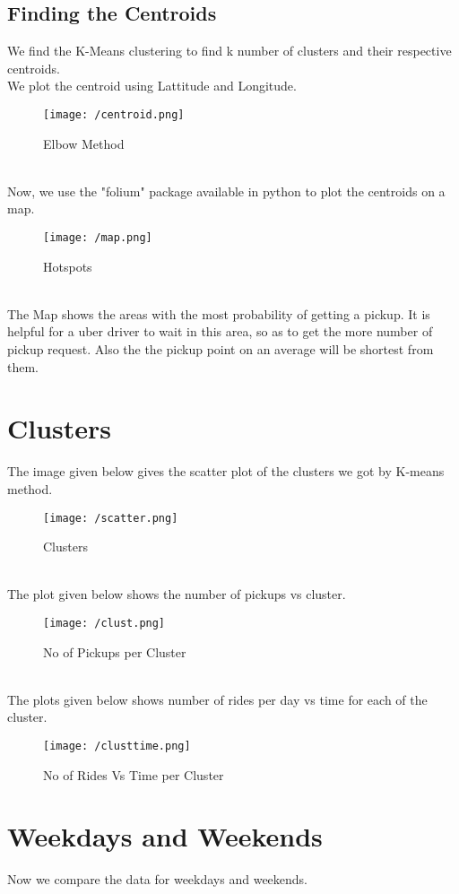 \documentclass[fleqn]{report}
\begin{document}
	\subsection{Finding the Centroids}
	We find the K-Means clustering to find k number of clusters and their respective centroids.\\
	We plot the centroid using Lattitude and Longitude.
	\begin{figure}[!ht]
		\centering
		\texttt{[image: /centroid.png]}
		\caption{Elbow Method}
		\label{fig:centroid}
	\end{figure}\\
	Now, we use the "folium" package available in python to plot the centroids on a map.
	\begin{figure}[!ht]
		\centering
		\texttt{[image: /map.png]}
		\caption{Hotspots}
		\label{fig:map}
	\end{figure}\\ 
	The Map shows the areas with the most probability of getting a pickup. It is helpful for a uber driver to wait in this area, so as to get the more number of pickup request. Also the the pickup point on an average will be shortest from them.
	
	\section{Clusters}
	The image given below gives the scatter plot of the clusters we got by K-means method.
	 \begin{figure}[!ht]
	 	\centering
	 	\texttt{[image: /scatter.png]}
	 	\caption{Clusters}
	 	\label{fig:scatter}
	 \end{figure}\\ 
 	The plot given below shows the number of pickups vs cluster.
 	\begin{figure}[!ht]
 		\centering
 		\texttt{[image: /clust.png]}
 		\caption{No of Pickups per Cluster}
 		\label{fig:clust}
 	\end{figure}\\
 	The plots given below shows number of rides per day vs time for each of the cluster.
 	 \begin{figure}[!ht]
 		\centering
 		\texttt{[image: /clusttime.png]}
 		\caption{No of Rides Vs Time per Cluster}
 		\label{fig:c}
 	\end{figure} 
  	\section{Weekdays and Weekends}
  	Now we compare the data for weekdays and weekends.\\
\end{document}
